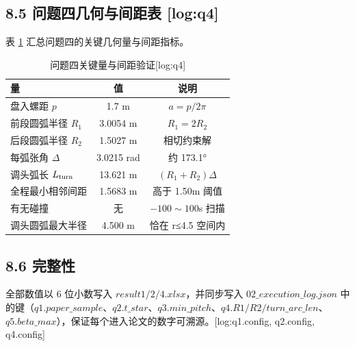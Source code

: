\subsection*{8.5 问题四几何与间距表 [log:q4]}
表 \ref{tab:q4geo} 汇总问题四的关键几何量与间距指标。

\begin{table}[H]\centering
\caption{问题四关键量与间距验证[log:q4]}
\label{tab:q4geo}
\begin{tabular}{lcc}
\toprule
量 & 值 & 说明 \\
\midrule
盘入螺距 $p$ & 1.7 m & $a=p/2\pi$ \\
前段圆弧半径 $R_1$ & 3.0054 m & $R_1=2R_2$ \\
后段圆弧半径 $R_2$ & 1.5027 m & 相切约束解 \\
每弧张角 $\Delta$ & 3.0215 rad & 约 173.1° \\
调头弧长 $L_{\rm turn}$ & 13.621 m & $(R_1+R_2)\Delta$ \\
全程最小相邻间距 & 1.5683 m & 高于 1.50m 阈值 \\
有无碰撞 & 无 & $-100\sim100$s 扫描 \\
调头圆弧最大半径 & 4.500 m & 恰在 r≤4.5 空间内 \\
\bottomrule
\end{tabular}
\end{table}

\subsection*{8.6 完整性}
全部数值以 6 位小数写入 $result1/2/4.xlsx$，并同步写入 $02\_execution\_log.json$ 中的键（$q1.paper\_sample$、$q2.t\_star$、$q3.min\_pitch$、$q4.R1/R2/turn\_arc\_len$、$q5.beta\_max$），保证每个进入论文的数字可溯源。[log:q1.config, q2.config, q4.config]